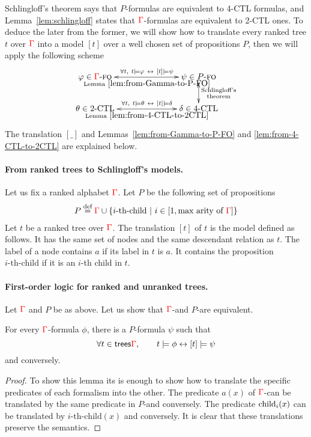 Schlingloff's theorem says that $P$-\fo formulas are equivalent to 4-CTL formulas, and  Lemma~\ref{lem:schlingloff} states that ${\color{red}{\Gamma}}$-\fo formulas are equivalent to 2-CTL ones. To deduce the later from the former, we will show how to translate every ranked tree $t$ over ${\color{red}{\Gamma}}$ into a model $[t]$ over a well chosen set of propositions $P$, then we will apply the following scheme
    $$\xymatrix@C=2.5cm{
        \varphi \in \rGamma\text{-\fo} 
        \ar@{<->}[r]^{\forall t, \ t\models \varphi \ \leftrightarrow \ [t] \models \psi}_{\text{Lemma}~\ref{lem:from-Gamma-to-P-FO}}
        &
        \psi \in P \text{-\fo}
        \ar@{<->}[d]^{\substack{\text{Schlingloff's}\\\text{theorem}}} \\
       \theta \in \text{2-CTL}
        \ar@{<->}[r]^{\forall t, \ t\models \theta \ \leftrightarrow \ [t] \models \delta}_{\text{Lemma}~\ref{lem:from-4-CTL-to-2CTL}}
        &
        \delta \in \text{4-CTL}
    }$$    
The translation $[\_]$ and Lemmas~\ref{lem:from-Gamma-to-P-FO} and \ref{lem:from-4-CTL-to-2CTL} are explained below.

\paragraph{From ranked trees to Schlingloff's models.} Let us fix a ranked alphabet ${\color{red}{\Gamma}}$. Let $P$ be the following set of propositions
\begin{align*}
P\stackrel{\text{def}}= {\color{red}{\Gamma}}\cup\{i\text{-th-child}\ |\ i\in[1, \text{max arity of }{\color{red}{\Gamma}}]\}
\end{align*}
 Let $t$ be a ranked tree over ${\color{red}{\Gamma}}$. The translation $[t]$ of $t$ is the model defined as follows. It has the same set of nodes and the same descendant relation as $t$. The label of a node contains $a$ if its label in $t$ is $a$. It contains the proposition $i\text{-th-child}$ if it is an $i$-th child in $t$.

\paragraph{First-order logic for ranked and unranked trees.} Let ${\color{red}{\Gamma}}$ and $P$ be as above. Let us show that ${\color{red}{\Gamma}}$-\fo and $P$-\fo are equivalent.
\begin{lemma}\label{lem:from-Gamma-to-P-FO}
For every ${\color{red}{\Gamma}}$-\fo formula $\phi$, there is a $P$-\fo formula $\psi$ such that
$$ \forall t\in \mathsf {trees}{\color{red}{\Gamma}}, \qquad t\models \phi \leftrightarrow [t]\models \psi$$
and conversely.
\end{lemma}
\begin{proof}
To show this lemma its is enough to show how to translate the specific predicates of each formalism into the other. The predicate $a(x)$ of ${\color{red}{\Gamma}}$-\fo can be translated by the same predicate in $P$-\fo and conversely. The predicate $\mathrm{child}_{i}(x)$ can be translated by $i\text{-th-child}(x)$ and conversely.  It is clear that these translations preserve the semantics.
\end{proof}

